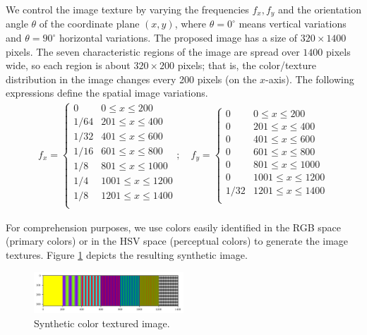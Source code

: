 \documentclass[journal]{IEEEtran}
\begin{document}
We control the image texture by varying the frequencies $f_{x}, f_{y}$ and the orientation angle $\theta$ of the coordinate plane $(x, y)$, where $\theta=0^\circ$ means vertical variations and $\theta=90^\circ$ horizontal variations. The proposed image has a size of $320\times1400$ pixels. The seven characteristic regions of the image are spread over $1400$ pixels wide, so each region is about $320\times200$ pixels; that is, the color/texture distribution in the image changes every 200 pixels (on the $x$-axis). The following expressions define the spatial image variations.  
\begin{gather}
	f_{x} = 
	\begin{cases} 
      0    & 0\leq x\leq 200  \\
      1/64 & 201\leq x\leq 400  \\
      1/32 & 401\leq x\leq 600  \\
      1/16 & 601\leq x\leq 800  \\
      1/8  & 801\leq x\leq 1000  \\
      1/4  & 1001\leq x\leq 1200 \\   
      1/8  & 1201\leq x\leq 1400 \\ 
   	 \end{cases} \nonumber ; \quad
   	 f_{y} = \begin{cases} 
      0    & 0\leq x\leq 200  \\
      0    & 201\leq x\leq 400  \\
      0    & 401\leq x\leq 600  \\
      0    & 601\leq x\leq 800  \\
      0    & 801\leq x\leq 1000  \\
      0    & 1001\leq x\leq 1200 \\  
      1/32 & 1201\leq x\leq 1400 \\ 
   	 \end{cases} \nonumber  
\end{gather}

For comprehension purposes, we use colors easily identified in the RGB space (primary colors) or in the HSV space (perceptual colors) to generate the image textures. Figure \ref{fig:synthetic_color_texture_image} depicts the resulting synthetic image. 

\begin{figure}[!ht]
    \includegraphics[width=0.5\textwidth]{synthetic_image_color_texture}
\caption{Synthetic color textured image.}\label{fig:synthetic_color_texture_image}
\end{figure}
\end{document}

